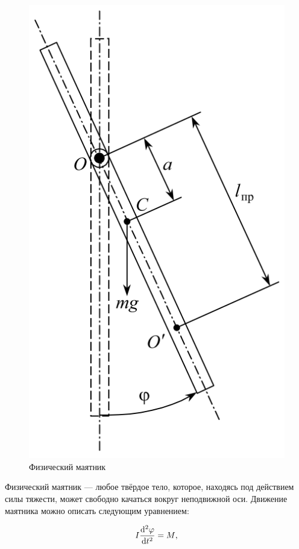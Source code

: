 \documentclass{article}
\begin{document}
\begin{figure}
	\includegraphics[width=1\linewidth]{ustanovka.png}
	\caption{Физический маятник}
\end{figure}

Физический маятник --- любое твёрдое тело, которое, находясь под действием силы тяжести, может свободно качаться вокруг неподвижной оси. Движение маятника можно описать следующим уравнением:

\begin{equation} \label{baza}
I\dv[2]{\varphi}{t}=M \text{,}
\end{equation}
\end{document}
